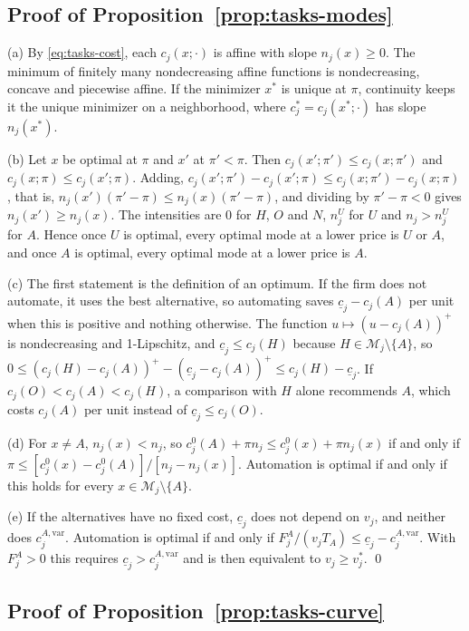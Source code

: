 \subsection*{Proof of Proposition~\ref{prop:tasks-modes}}

(a) By \eqref{eq:tasks-cost}, each $c_j(x;\cdot)$ is affine with slope $n_j(x)\ge 0$. The minimum of finitely many nondecreasing affine functions is nondecreasing, concave and piecewise affine. If the minimizer $x^*$ is unique at $\pi$, continuity keeps it the unique minimizer on a neighborhood, where $c^*_j=c_j(x^*;\cdot)$ has slope $n_j(x^*)$.

(b) Let $x$ be optimal at $\pi$ and $x'$ at $\pi'<\pi$. Then $c_j(x';\pi')\le c_j(x;\pi')$ and $c_j(x;\pi)\le c_j(x';\pi)$. Adding, $c_j(x';\pi')-c_j(x';\pi)\le c_j(x;\pi')-c_j(x;\pi)$, that is, $n_j(x')(\pi'-\pi)\le n_j(x)(\pi'-\pi)$, and dividing by $\pi'-\pi<0$ gives $n_j(x')\ge n_j(x)$. The intensities are $0$ for $H$, $O$ and $N$, $n^U_j$ for $U$ and $n_j>n^U_j$ for $A$. Hence once $U$ is optimal, every optimal mode at a lower price is $U$ or $A$, and once $A$ is optimal, every optimal mode at a lower price is $A$.

(c) The first statement is the definition of an optimum. If the firm does not automate, it uses the best alternative, so automating saves $\underline c_j-c_j(A)$ per unit when this is positive and nothing otherwise. The function $u\mapsto(u-c_j(A))^+$ is nondecreasing and 1-Lipschitz, and $\underline c_j\le c_j(H)$ because $H\in\mathcal M_j\setminus\{A\}$, so $0\le(c_j(H)-c_j(A))^+-(\underline c_j-c_j(A))^+\le c_j(H)-\underline c_j$. If $c_j(O)<c_j(A)<c_j(H)$, a comparison with $H$ alone recommends $A$, which costs $c_j(A)$ per unit instead of $\underline c_j\le c_j(O)$.

(d) For $x\ne A$, $n_j(x)<n_j$, so $c^0_j(A)+\pi n_j\le c^0_j(x)+\pi n_j(x)$ if and only if $\pi\le[c^0_j(x)-c^0_j(A)]/[n_j-n_j(x)]$. Automation is optimal if and only if this holds for every $x\in\mathcal M_j\setminus\{A\}$.

(e) If the alternatives have no fixed cost, $\underline c_j$ does not depend on $v_j$, and neither does $c^{A,\mathrm{var}}_j$. Automation is optimal if and only if $F^A_j/(v_jT_A)\le\underline c_j-c^{A,\mathrm{var}}_j$. With $F^A_j>0$ this requires $\underline c_j>c^{A,\mathrm{var}}_j$ and is then equivalent to $v_j\ge v^*_j$. \qed

\subsection*{Proof of Proposition~\ref{prop:tasks-curve}}

